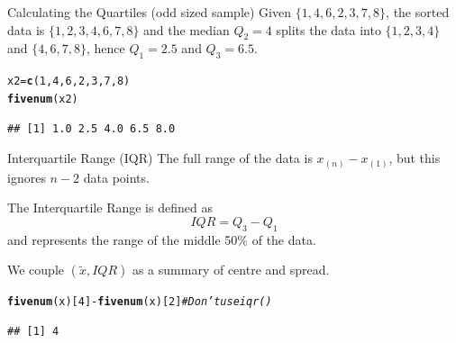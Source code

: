 \documentclass[t,xcolor=pdftex,dvipsnames,table]{beamer}
\makeatletter
\newcommand{\hlnum}[1]{\textcolor[rgb]{0.686,0.059,0.569}{#1}}%
\newcommand{\hlcom}[1]{\textcolor[rgb]{0.678,0.584,0.686}{\textit{#1}}}%
\newcommand{\hlopt}[1]{\textcolor[rgb]{0,0,0}{#1}}%
\newcommand{\hlstd}[1]{\textcolor[rgb]{0.345,0.345,0.345}{#1}}%
\newcommand{\hlkwb}[1]{\textcolor[rgb]{0.69,0.353,0.396}{#1}}%
\newcommand{\hlkwd}[1]{\textcolor[rgb]{0.737,0.353,0.396}{\textbf{#1}}}%
\newenvironment{kframe}{%
 \def\at@end@of@kframe{}%
 \ifinner\ifhmode%
  \def\at@end@of@kframe{\end{minipage}}%
  \begin{minipage}{\columnwidth}%
 \fi\fi%
 \def\FrameCommand##1{\hskip\@totalleftmargin \hskip-\fboxsep
 \colorbox{shadecolor}{##1}\hskip-\fboxsep
     \hskip-\linewidth \hskip-\@totalleftmargin \hskip\columnwidth}%
 \MakeFramed {\advance\hsize-\width
   \@totalleftmargin\z@ \linewidth\hsize
   \@setminipage}}%
 {\par\unskip\endMakeFramed%
 \at@end@of@kframe}
\newenvironment{knitrout}{}{} %
\makeatother
\begin{document}
\begin{frame}[fragile]{}
\begin{block}{Calculating the Quartiles (odd sized sample)}
Given $\{ 1,4,6,2,3,7,8\}$, the sorted data is $\{ 1,2,3,4,6,7,8 \}$ and the median $Q_{2} = 4$ splits the data into $\{ 1,2,3,4 \}$ and $\{ 4,6,7,8 \}$, hence $Q_{1} = 2.5$ and $Q_{3} = 6.5$.
\end{block}

\begin{knitrout}
\color{fgcolor}\begin{kframe}
\begin{alltt}
\hlstd{x2}\hlkwb{=}\hlkwd{c}\hlstd{(}\hlnum{1}\hlstd{,}\hlnum{4}\hlstd{,}\hlnum{6}\hlstd{,}\hlnum{2}\hlstd{,}\hlnum{3}\hlstd{,}\hlnum{7}\hlstd{,}\hlnum{8}\hlstd{)}
\hlkwd{fivenum}\hlstd{(x2)}
\end{alltt}
\begin{verbatim}
## [1] 1.0 2.5 4.0 6.5 8.0
\end{verbatim}
\end{kframe}
\end{knitrout}
\end{frame}


\begin{frame}[fragile]{Interquartile Range (IQR)}
The full range of the data is $x_{(n)} - x_{(1)}$, but this ignores $n-2$ data points.

\vspace{.5cm}
The Interquartile Range is defined as
\[ IQR = Q_{3} -Q_{1} \]
and represents the range of the middle 50\% of the data. 

\vspace{.5cm}
We couple $(\tilde{x}, IQR)$ as a summary of centre and spread.
\begin{knitrout}
\color{fgcolor}\begin{kframe}
\begin{alltt}
\hlkwd{fivenum}\hlstd{(x)[}\hlnum{4}\hlstd{]}\hlopt{-}\hlkwd{fivenum}\hlstd{(x)[}\hlnum{2}\hlstd{]}   \hlcom{# Don't use iqr()}
\end{alltt}
\begin{verbatim}
## [1] 4
\end{verbatim}
\end{kframe}
\end{knitrout}
\end{frame}
\end{document}
